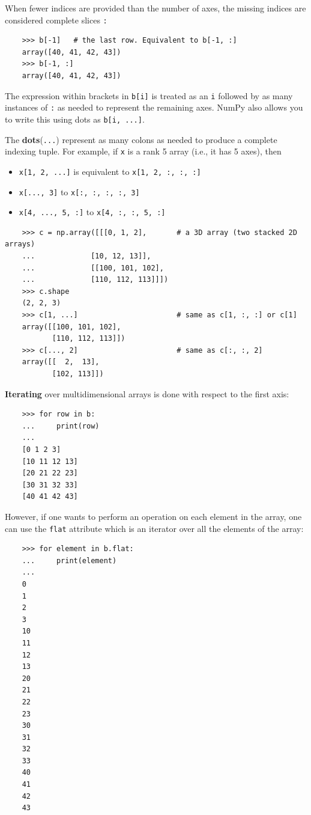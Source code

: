 \documentclass[UTF8]{article}
\begin{document}
When fewer indices are provided than the number of axes, the missing indices are considered
complete slices \texttt{:}
\begin{verbatim}
    >>> b[-1]   # the last row. Equivalent to b[-1, :]
    array([40, 41, 42, 43])
    >>> b[-1, :]
    array([40, 41, 42, 43])
\end{verbatim}

The expression within brackets in \texttt{b[i]} is treated as an \texttt{i} followed by as many
instances of \texttt{:} as needed to represent the remaining axes. NumPy also allows you to write
this using dots as \texttt{b[i, ...]}.

The \textbf{dots}(\texttt{...}) represent as many colons as needed to produce a complete indexing
tuple. For example, if \texttt{x} is a rank 5 array (i.e., it has 5 axes), then
\begin{itemize}
    \item \texttt{x[1, 2, ...]} is equivalent to \texttt{x[1, 2, :, :, :]}
    \item \texttt{x[..., 3]} to \texttt{x[:, :, :, :, 3]}
    \item \texttt{x[4, ..., 5, :]} to \texttt{x[4, :, :, 5, :]}
\end{itemize}
\begin{verbatim}
    >>> c = np.array([[[0, 1, 2],       # a 3D array (two stacked 2D arrays)
    ...             [10, 12, 13]],
    ...             [[100, 101, 102],
    ...             [110, 112, 113]]])
    >>> c.shape
    (2, 2, 3)
    >>> c[1, ...]                       # same as c[1, :, :] or c[1]
    array([[100, 101, 102],
           [110, 112, 113]])
    >>> c[..., 2]                       # same as c[:, :, 2]
    array([[  2,  13],
           [102, 113]])
\end{verbatim}

\textbf{Iterating} over multidimensional arrays is done with respect to the first axis:
\begin{verbatim}
    >>> for row in b:
    ...     print(row)
    ...
    [0 1 2 3]
    [10 11 12 13]
    [20 21 22 23]
    [30 31 32 33]
    [40 41 42 43]
\end{verbatim}

However, if one wants to perform an operation on each element in the array, one can use the
\texttt{flat} attribute which is an iterator over all the elements of the array:
\begin{verbatim}
    >>> for element in b.flat:
    ...     print(element)
    ...
    0
    1
    2
    3
    10
    11
    12
    13
    20
    21
    22
    23
    30
    31
    32
    33
    40
    41
    42
    43
\end{verbatim}
\end{document}
